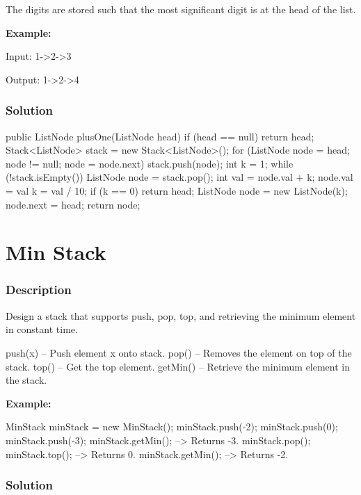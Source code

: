 The digits are stored such that the most significant digit is at the head of the list.

\textbf{Example:}
\begin{Code}
Input:
1->2->3

Output:
1->2->4
\end{Code}

\subsubsection{Solution}

\begin{Code}
public ListNode plusOne(ListNode head) {
    if (head == null) {
        return head;
    }
    Stack<ListNode> stack = new Stack<ListNode>();
    for (ListNode node = head; node != null; node = node.next) {
        stack.push(node);
    }
    int k = 1;
    while (!stack.isEmpty()) {
        ListNode node = stack.pop();
        int val = node.val + k;
        node.val = val %
        k = val / 10;
        if (k == 0) {
            return head;
        }
    }
    ListNode node = new ListNode(k);
    node.next = head;
    return node;
}
\end{Code}

\newpage

\section{Min Stack} %

\subsubsection{Description}
Design a stack that supports push, pop, top, and retrieving the minimum element in constant time.
\begin{Code}
push(x) -- Push element x onto stack.
pop() -- Removes the element on top of the stack.
top() -- Get the top element.
getMin() -- Retrieve the minimum element in the stack.
\end{Code}

\textbf{Example:}
\begin{Code}
MinStack minStack = new MinStack();
minStack.push(-2);
minStack.push(0);
minStack.push(-3);
minStack.getMin();   --> Returns -3.
minStack.pop();
minStack.top();      --> Returns 0.
minStack.getMin();   --> Returns -2.
\end{Code}
\subsubsection{Solution}

